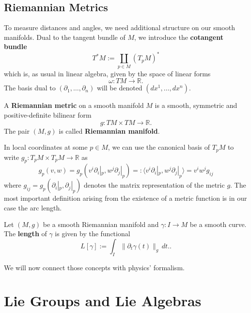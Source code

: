 \subsection*{Riemannian Metrics}
To measure distances and angles, we need additional structure on our smooth manifolds. Dual to the tangent bundle of $M$, we introduce the \textbf{cotangent bundle}
\[
    T^\ast M:= \coprod_{p \in M} (T_pM)^\ast
\] which is, as usual in linear algebra, given by the space of linear forms
\[
\omega: TM \to \mathbb{R}
.\] The basis dual to $(\partial_1, \dots, \partial_n)$ will be denoted $(dx^1, \dots, dx^n)$. 
\begin{definition}
    A \textbf{Riemannian metric} on a smooth manifold $M$ is a smooth, symmetric and positive-definite bilinear form
    \[
    g: TM \times TM \to \mathbb{R}
    .\] The pair $(M,g)$ is called \textbf{Riemannian manifold}.
\end{definition}
In local coordinates at some $p \in M$, we can use the canonical basis of $T_pM$ to write $g_p: T_pM \times T_p M \to \mathbb{R}$ as
\[
    g_p(v,w) = g_p(v^i \partial_i|_p, w^j \partial_j|_p) =: \langle v^i\partial_i|_p, w^j \partial_j|_p \rangle =  v^i w^j g_{ij}
\] where $g_{ij}=g_p(\partial_i|_p, \partial_j|_p)$ denotes the matrix representation of the metric $g$. The most important definition arising from the existence of a metric function is in our case the arc length.
\begin{definition}[Length]
    Let $(M,g)$ be a smooth Riemannian manifold and $\gamma: I \to M$ be a smooth curve. The \textbf{length} of $\gamma$ is given by the functional
    \[
        L[\gamma]:= \int_I \| \partial_t \gamma(t)\|_g \, dt.
    .\] 
\end{definition}
We will now connect those concepts with physics' formalism.

\section{Lie Groups and Lie Algebras}
